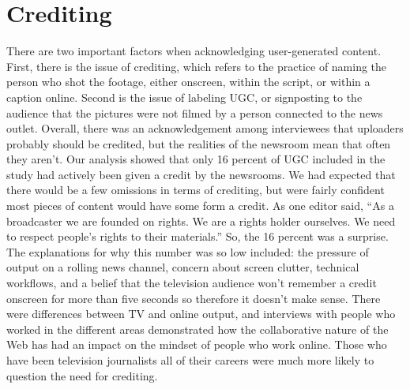 \documentclass[symmetric, notoc, nobib]{towcenter-book}
\begin{document}
\chapter{Crediting}
There are two important factors when acknowledging user-generated content.
First, there is the issue of crediting, which refers to the practice of
naming the person who shot the footage, either onscreen, within the script,
or within a caption online. Second is the issue of labeling UGC, or signposting
to the audience that the pictures were not filmed by a person connected
to the news outlet.
Overall, there was an acknowledgement among interviewees that uploaders
probably should be credited, but the realities of the newsroom mean
that often they aren't. Our analysis showed that only 16 percent of UGC
included in the study had actively been given a credit by the newsrooms.
We had expected that there would be a few omissions in terms of crediting,
but were fairly confident most pieces of content would have some form a
credit. As one editor said, ``As a broadcaster we are founded on rights. We
are a rights holder ourselves. We need to respect people's rights to their
materials.'' So, the 16 percent was a surprise.
The explanations for why this number was so low included: the pressure of
output on a rolling news channel, concern about screen clutter, technical
workflows, and a belief that the television audience won't remember a credit
onscreen for more than five seconds so therefore it doesn't make sense.
There were differences between TV and online output, and interviews with
people who worked in the different areas demonstrated how the collaborative
nature of the Web has had an impact on the mindset of people who
work online. Those who have been television journalists all of their careers
were much more likely to question the need for crediting.
\end{document}
